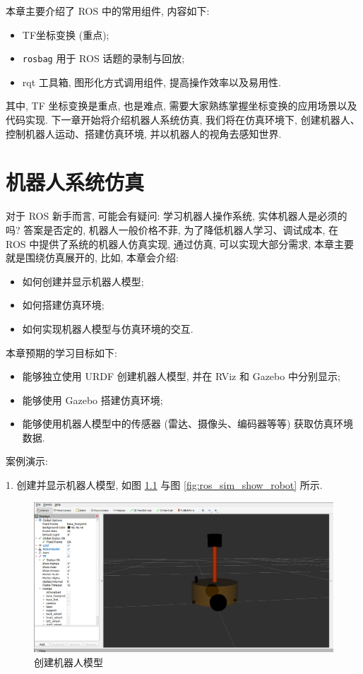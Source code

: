 \documentclass[openany, fontset=windowsold]{ctexbook}
\theoremstyle{kaiti}
\theoremstyle{normal}
\begin{document}
本章主要介绍了 ROS 中的常用组件, 内容如下:

\begin{itemize}
  \item TF坐标变换 (重点);
  \item \verb|rosbag| 用于 ROS 话题的录制与回放;
  \item rqt 工具箱, 图形化方式调用组件, 提高操作效率以及易用性.
\end{itemize}

其中, TF 坐标变换是重点, 也是难点, 需要大家熟练掌握坐标变换的应用场景以及代码实现. 下一章开始将介绍机器人系统仿真, 我们将在仿真环境下, 创建机器人、控制机器人运动、搭建仿真环境, 并以机器人的视角去感知世界.

\chapter{机器人系统仿真}
\label{chapter:robot_simulation}

对于 ROS 新手而言, 可能会有疑问: 学习机器人操作系统, 实体机器人是必须的吗? 答案是否定的, 机器人一般价格不菲, 为了降低机器人学习、调试成本, 在 ROS 中提供了系统的机器人仿真实现, 通过仿真, 可以实现大部分需求, 本章主要就是围绕仿真展开的, 比如, 本章会介绍:

\begin{itemize}
  \item 如何创建并显示机器人模型; 
  \item 如何搭建仿真环境; 
  \item 如何实现机器人模型与仿真环境的交互.
\end{itemize}

本章预期的学习目标如下:

\begin{itemize}
  \item 能够独立使用 URDF 创建机器人模型, 并在 RViz 和 Gazebo 中分别显示; 
  \item 能够使用 Gazebo 搭建仿真环境; 
  \item 能够使用机器人模型中的传感器 (雷达、摄像头、编码器等等) 获取仿真环境数据.
\end{itemize}

案例演示:

1. 创建并显示机器人模型, 如图 \ref{fig:ros_sim_create_robot} 与图 \ref{fig:ros_sim_show_robot} 所示.

\begin{figure}[!ht]
  \centering
  \includegraphics[width=.9\textwidth]{ros_sim_create_robot.png}
  \caption{创建机器人模型}
  \label{fig:ros_sim_create_robot}
\end{figure}
\end{document}
